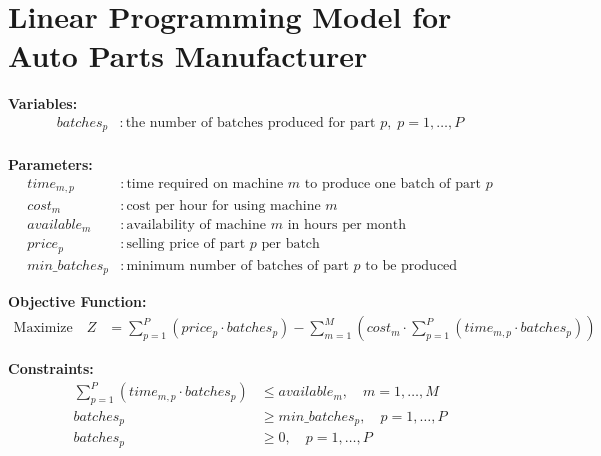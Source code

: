 \documentclass{article}
\begin{document}
\section*{Linear Programming Model for Auto Parts Manufacturer}

\textbf{Variables:}
\begin{align*}
batches_{p} & : \text{the number of batches produced for part } p, \; p = 1, \ldots, P \\
\end{align*}

\textbf{Parameters:}
\begin{align*}
time_{m,p} & : \text{time required on machine } m \text{ to produce one batch of part } p \\
cost_{m} & : \text{cost per hour for using machine } m \\
available_{m} & : \text{availability of machine } m \text{ in hours per month} \\
price_{p} & : \text{selling price of part } p \text{ per batch} \\
min\_batches_{p} & : \text{minimum number of batches of part } p \text{ to be produced}
\end{align*}

\textbf{Objective Function:}
\begin{align*}
\text{Maximize} \quad Z & = \sum_{p=1}^{P} \left( price_{p} \cdot batches_{p} \right) - \sum_{m=1}^{M} \left( cost_{m} \cdot \sum_{p=1}^{P} (time_{m,p} \cdot batches_{p}) \right)
\end{align*}

\textbf{Constraints:}
\begin{align}
\sum_{p=1}^{P} (time_{m,p} \cdot batches_{p}) & \leq available_{m}, \quad m = 1, \ldots, M \tag{Machine Availability Constraints} \\
batches_{p} & \geq min\_batches_{p}, \quad p = 1, \ldots, P \tag{Minimum Production Constraints} \\
batches_{p} & \geq 0, \quad p = 1, \ldots, P \tag{Non-negativity Constraints}
\end{align}
\end{document}
